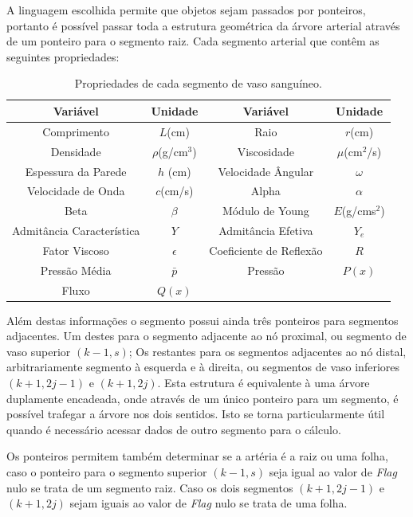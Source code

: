 \documentclass[
        english,			
        brazil			        %
        ,<...>]{abntbibufjf}
\begin{document}
A linguagem escolhida permite que objetos sejam passados por ponteiros, portanto é possível passar toda a estrutura geométrica da árvore arterial através de um ponteiro para o segmento raiz. Cada segmento arterial que contêm as seguintes propriedades:
\begin{table}[h]
\begin{tabular}{|c|c|c|c|}
	\hline
	\textbf{Variável} & \textbf{Unidade} & \textbf{Variável} & \textbf{Unidade} \\
	\hline
	Comprimento & $L$(cm) & Raio & $r$(cm) \\
	\hline
	Densidade & $\rho$(g/cm$^3$) & Viscosidade & $\mu$(cm$^2$/s) \\
	\hline
	Espessura da Parede & $h$ (cm) & Velocidade Ângular & $\omega$  \\
	\hline
	Velocidade de Onda & $c$(cm/s) & Alpha & $\alpha$ \\
	\hline
	Beta & $\beta$ & Módulo de Young & $E$(g/cms$^2$)\\
	\hline
	Admitância Característica & $Y$ & Admitância Efetiva & $Y_e$\\
	\hline
	Fator Viscoso & $\epsilon$ & Coeficiente de Reflexão & $R$ \\
	\hline
	Pressão Média & $\bar{p}$ & Pressão & $P(x)$\\
	\hline
	Fluxo & $Q(x)$ && \\
	\hline
\end{tabular}
\caption{Propriedades de cada segmento de vaso sanguíneo.}
\end{table}

Além destas informações o segmento possui ainda três ponteiros para segmentos adjacentes. Um destes para o segmento adjacente ao nó proximal, ou segmento de vaso superior $(k-1,s)$; Os restantes para os segmentos adjacentes ao nó distal, arbitrariamente segmento à esquerda e à direita, ou segmentos de vaso inferiores $(k+1,2j-1)$ e $(k+1,2j)$. Esta estrutura é equivalente à uma árvore duplamente encadeada, onde através de um único ponteiro para um segmento, é possível trafegar a árvore nos dois sentidos. Isto se torna particularmente útil quando é necessário acessar dados de outro segmento para o cálculo.

Os ponteiros permitem também determinar se a artéria é a raiz ou uma folha, caso o ponteiro para o segmento superior $(k-1,s)$ seja igual ao valor de \textit{Flag} nulo se trata de um segmento raiz. Caso os dois segmentos $(k+1,2j-1)$ e $(k+1,2j)$ sejam iguais ao valor de \textit{Flag} nulo se trata de uma folha.
\end{document}
